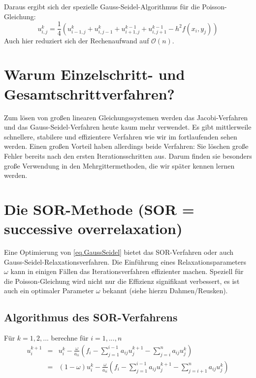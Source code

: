 Daraus ergibt sich der spezielle Gauss-Seidel-Algorithmus für die Poisson-Gleichung:
\begin{equation}
u^{k}_{i,j} =   \frac {1} {4} (u^{k}_{i-1,j} + u^{k}_{i,j-1} + u^{k-1}_{i+1,j} + u^{k-1}_{i,j+1} - h^{2}f(x_{i},y_{j}))
\end{equation}
Auch hier reduziert sich der Rechenaufwand auf $\mathcal{O}(n)$.


\section{Warum Einzelschritt- und Gesamtschrittverfahren?}\label{s.Warum Einzelschritt- und Gesamtschrittverfahren?}
Zum lösen von großen linearen Gleichungssystemen werden das Jacobi-Verfahren und das Gauss-Seidel-Verfahren heute kaum mehr verwendet. Es gibt mittlerweile schnellere, stabilere und effizientere Verfahren wie wir im fortlaufenden sehen werden. Einen großen Vorteil haben allerdings beide Verfahren: Sie löschen große Fehler bereits nach den ersten Iterationsschritten aus. Darum finden sie besonders große Verwendung in den Mehrgittermethoden, die wir später kennen lernen werden.

\section{Die SOR-Methode (SOR = successive overrelaxation)}\label{s.SOR-Methode}

Eine Optimierung von \autoref{eq.GaussSeidel} bietet das SOR-Verfahren oder auch Gauss-Seidel-Relaxationsverfahren. Die Einführung eines Relaxationsparameters $\omega$ kann in einigen Fällen das Iterationsverfahren effizienter machen. Speziell für die Poisson-Gleichung wird nicht nur die Effizienz signifikant verbessert, es ist auch ein optimaler Parameter $\omega$ bekannt (siehe hierzu Dahmen/Reusken).

\subsection{Algorithmus des SOR-Verfahrens}\label{ss.Algorithmus des SOR-Verfahrens}

Für $k = 1,2,...$ berechne für $i = 1,...,n$
\begin{eqnarray}
u_{i}^{k+1} &=& u_{i}^{k} - \frac {\omega} {a_{ii}} (f_{i} - \sum\limits_{j=1}^{i-1} a_{ij}u_{j}^{k+1} - \sum\limits_{j=i}^{n} a_{ij}u_{j}^{k}) \\
&=& (1-\omega)u_{i}^{k} - \frac {\omega} {a_{ii}} (f_{i} - \sum\limits_{j=1}^{i-1} a_{ij}u_{j}^{k+1} - \sum\limits_{j=i+1}^{n} a_{ij}u_{j}^{k})
\end{eqnarray}

